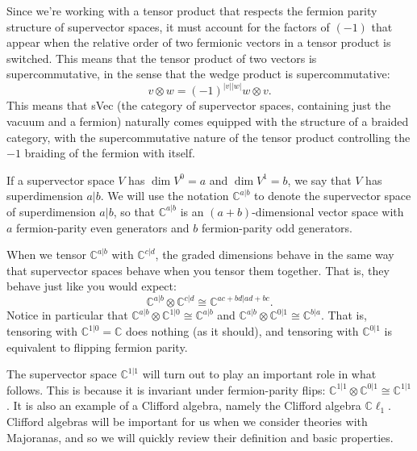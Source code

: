 \documentclass[12pt,a4paper]{article}
\newcommand{\tp}{\otimes}
\newcommand{\cc}{\mathbb{C}}
\newcommand\be            {\begin{equation}}
\newcommand\ee            {\end{equation}}
\newcommand{\cl}{\mathbb{C}\ell}
\newcommand{\dave}[1]{{\color{ao(english)}\footnotesize{(DA) #1}}}
\newcommand{\ethan}[1]{{\color{amethyst}\footnotesize{(EL) #1}}}
\begin{document}
Since we're working with a tensor product that respects the fermion parity structure of supervector spaces, it must account for the factors of $(-1)$ that appear when the relative order of two fermionic vectors in a tensor product is switched. This means that the tensor product of two vectors is supercommutative, in the sense that the wedge product is supercommutative:
\be v\tp w = (-1)^{|v||w|}w\tp v.\ee
This means that sVec (the category of supervector spaces, containing just the vacuum and a fermion) naturally comes equipped with the structure of a braided category, with the supercommutative nature of the tensor product controlling the $-1$ braiding of the fermion with itself. 


If a supervector space $V$ has $\dim V^0 = a$ and $\dim V^1 = b$, we say that $V$ has superdimension $a|b$. We will use the notation $\cc^{a|b}$ to denote the supervector space of superdimension $a|b$, so that $\cc^{a|b}$ is an $(a+b)$-dimensional vector space with $a$ fermion-parity even generators and $b$ fermion-parity odd generators. 

When we tensor $\cc^{a|b}$ with $\cc^{c|d}$, the graded dimensions behave in the same way that supervector spaces behave when you tensor them together. That is, they behave just like you would expect: 
\be  \cc^{a|b}\tp \cc^{c|d} \cong \cc^{ac + bd | ad + bc}.\ee
Notice in particular that $\cc^{a|b} \tp \cc^{1|0} \cong \cc^{a|b}$ and $\cc^{a|b} \tp \cc^{0|1} \cong \cc^{b|a}$. That is, tensoring with $\cc^{1|0} = \cc$ does nothing (as it should), and tensoring with $\cc^{0|1}$ is equivalent to flipping fermion parity. 

The supervector space $\cc^{1|1}$ will turn out to play an important role in what follows. This is because it is invariant under fermion-parity flips: $\cc^{1|1} \tp \cc^{0|1} \cong \cc^{1|1}$. It is also an example of a Clifford algebra, namely the Clifford algebra $\cl_1$. Clifford algebras will be important for us when we consider theories with Majoranas, and so we will quickly review their definition and basic properties. 
\end{document}
